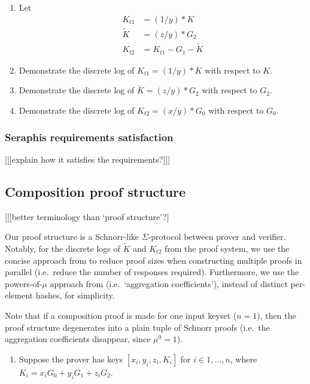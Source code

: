 \begin{appendices}
\begin{enumerate}
    \item Let
    \begin{align*}
        K_{t1} &= (1/y)*K \\
        \tilde{K} &= (z/y)*G_2 \\
        K_{t2} &= K_{t1} - G_1 - \tilde{K}
    \end{align*}

    \item Demonstrate the discrete log of $K_{t1} = (1/y)*K$ with respect to $K$.

    \item Demonstrate the discrete log of $\tilde{K} = (z/y)*G_2$ with respect to $G_2$.

    \item Demonstrate the discrete log of $K_{t2} = (x/y)*G_0$ with respect to $G_0$.
\end{enumerate}

\subsubsection{Seraphis requirements satisfaction}

[[[explain how it satisfies the requirements?]]]


\subsection{Composition proof structure}
\label{appendix:composition-proof-structure}

[[[better terminology than `proof structure'?]

Our proof structure is a Schnorr-like $\Sigma$-protocol between prover and verifier. Notably, for the discrete logs of $\tilde{K}$ and $K_{t2}$ from the proof system, we use the concise approach from \cite{clsag-eprint} to reduce proof sizes when constructing multiple proofs in parallel (i.e.\ reduce the number of responses required). Furthermore, we use the powers-of-$\mu$ approach from \cite{triptych-preprint} (i.e.\ `aggregation coefficients'), instead of distinct per-element hashes, for simplicity.

Note that if a composition proof is made for one input keyset ($n = 1$), then the proof structure degenerates into a plain tuple of Schnorr proofs (i.e.\ the aggregation coefficients disappear, since $\mu^0 = 1$).

\begin{enumerate}
    \item Suppose the prover has keys $[x_i, y_i, z_i, K_i]$ for $i \in 1,...,n$, where $K_i = x_i G_0 + y_i G_1 + z_i G_2$.


\end{enumerate}
\end{appendices}
